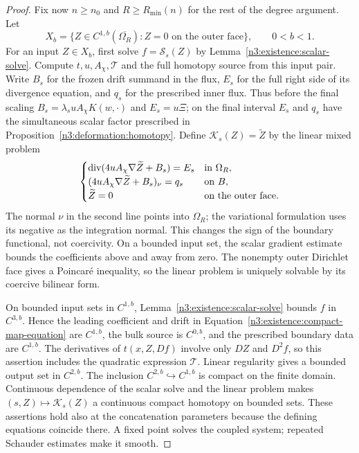 \begin{proof}
Fix now $n\ge n_0$ and $R\ge R_{\min}(n)$ for the rest of the
degree argument.  Let
\begin{equation}\label{n3:existence:banach-space}
 X_b=\{Z\in C^{1,b}(\overline{\Omega_R}):
                       Z=0\text{ on the outer face}\},
 \qquad 0<b<1.
\end{equation}
For an input $Z\in X_b$, first solve
$f=\mathcal S_s(Z)$ by Lemma~\ref{n3:existence:scalar-solve}.
Compute $t,u,A_\chi,\mathcal T$ and the full homotopy source
from this input pair.  Write $B_s$ for the frozen drift summand in
the flux, $E_s$ for the full right side of its divergence equation,
and $q_s$ for the prescribed inner flux.  Thus before the final
scaling $B_s=\lambda_suA_\chi K(w,\cdot)$ and $E_s=u\Xi$;
on the final interval $E_s$ and $q_s$ have the simultaneous scalar
factor prescribed in Proposition~\ref{n3:deformation:homotopy}.
Define $\mathcal K_s(Z)=\widetilde Z$ by the linear mixed problem
\begin{equation}\label{n3:existence:compact-map-equation}
 \begin{cases}
  \operatorname{div}(4uA_\chi\nabla\widetilde Z+B_s)=E_s
                           &\text{in }\Omega_R,\\
  (4uA_\chi\nabla\widetilde Z+B_s)_\nu=q_s
                           &\text{on }B,\\
  \widetilde Z=0           &\text{on the outer face}.
 \end{cases}
\end{equation}
The normal $\nu$ in the second line points into $\Omega_R$; the
variational formulation uses its negative as the integration
normal.  This changes the sign of the boundary functional, not
coercivity.  On a bounded input set, the scalar gradient estimate
bounds the coefficients above and away from zero.  The nonempty
outer Dirichlet face gives a Poincar\'e inequality, so the linear
problem is uniquely solvable by its coercive bilinear form.

On bounded input sets in $C^{1,b}$,
Lemma~\ref{n3:existence:scalar-solve} bounds $f$ in $C^{3,b}$.
Hence the leading coefficient and drift in
Equation~\eqref{n3:existence:compact-map-equation} are $C^{1,b}$,
the bulk source is $C^{0,b}$, and the prescribed boundary data are
$C^{1,b}$.  The derivatives of $t(x,Z,Df)$ involve only $DZ$
and $D^2f$, so this assertion includes the quadratic expression
$\mathcal T$.  Linear regularity gives a bounded output set in
$C^{2,b}$.  The inclusion $C^{2,b}\hookrightarrow C^{1,b}$ is
compact on the finite domain.  Continuous dependence of the scalar
solve and the linear problem makes $(s,Z)\mapsto\mathcal K_s(Z)$
a continuous compact homotopy on bounded sets.  These assertions
hold also at the concatenation parameters because the defining
equations coincide there.  A fixed point solves the coupled system;
repeated Schauder estimates make it smooth.


\end{proof}
